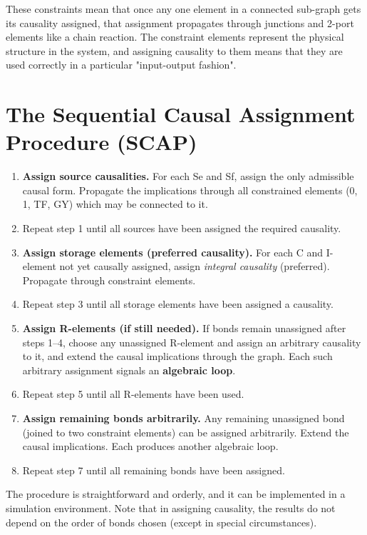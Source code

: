 These constraints mean that once any one element in a connected sub-graph gets its causality assigned, that assignment propagates through junctions and 2-port elements like a chain reaction. The constraint elements represent the physical structure in the system, and assigning causality to them means that they are used correctly in a particular "input-output fashion".

\section{The Sequential Causal Assignment Procedure (SCAP)}

\begin{enumerate}[leftmargin=2em,label=\textbf{Step \arabic*.},itemsep=4pt]
  \item \textbf{Assign source causalities.} For each Se and Sf, assign the only admissible causal form. Propagate the implications through all constrained elements (0, 1, TF, GY) which may be connected to it. 
  \item Repeat step 1 until all sources have been assigned the required causality.
  \item \textbf{Assign storage elements (preferred causality).} For each C and I-element not yet causally assigned, assign \emph{integral causality} (preferred). Propagate through constraint elements. 
  \item Repeat step 3 until all storage elements have been assigned a causality. 
  \item \textbf{Assign R-elements (if still needed).} If bonds remain unassigned after steps 1--4, choose any unassigned R-element and assign an arbitrary causality to it, and extend the causal implications through the graph. Each such arbitrary assignment signals an \textbf{algebraic loop}. 
  \item Repeat step 5 until all R-elements have been used.
  \item \textbf{Assign remaining bonds arbitrarily.} Any remaining unassigned bond (joined to two constraint elements) can be assigned arbitrarily. Extend the causal implications. Each produces another algebraic loop.
  \item Repeat step 7 until all remaining bonds have been assigned.
\end{enumerate}

The procedure is straightforward and orderly, and it can be implemented in a simulation environment. Note that in assigning causality, the results do not depend on the order of bonds chosen (except in special circumstances).

